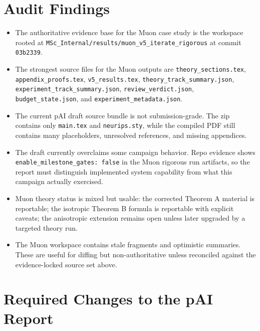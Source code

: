 \documentclass[11pt]{article}
\begin{document}
\section*{Audit Findings}
\begin{itemize}
  \item The authoritative evidence base for the Muon case study is the workspace rooted at \texttt{MSc\_Internal/results/muon\_v5\_iterate\_rigorous} at commit \texttt{03b2339}.
  \item The strongest source files for the Muon outputs are \texttt{theory\_sections.tex}, \texttt{appendix\_proofs.tex}, \texttt{v5\_results.tex}, \texttt{theory\_track\_summary.json}, \texttt{experiment\_track\_summary.json}, \texttt{review\_verdict.json}, \texttt{budget\_state.json}, and \texttt{experiment\_metadata.json}.
  \item The current pAI draft source bundle is not submission-grade. The zip contains only \texttt{main.tex} and \texttt{neurips.sty}, while the compiled PDF still contains many placeholders, unresolved references, and missing appendices.
  \item The draft currently overclaims some campaign behavior. Repo evidence shows \texttt{enable\_milestone\_gates: false} in the Muon rigorous run artifacts, so the report must distinguish implemented system capability from what this campaign actually exercised.
  \item Muon theory status is mixed but usable: the corrected Theorem A material is reportable; the isotropic Theorem B formula is reportable with explicit caveats; the anisotropic extension remains open unless later upgraded by a targeted theory run.
  \item The Muon workspace contains stale fragments and optimistic summaries. These are useful for diffing but non-authoritative unless reconciled against the evidence-locked source set above.
\end{itemize}

\section*{Required Changes to the pAI Report}
\end{document}
